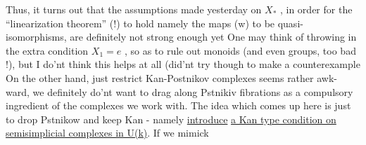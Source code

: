 Thus,  it turns out that the assumptions made yesterday on $X_{*}$ ,
in order for the ``linearization theorem'' (!) to hold\hand{,} namely the maps (w)
to be quasi-isomorphisms,  are definitely not strong enough yet One
may think of throwing in the extra condition  $X_{1}=e$ ,  so as to rule out
monoids (and even groups, too bad !),   but I do'nt think this
helps at all (did'nt try though to make a counterexample  On the
other hand,  just restrict Kan-Postnikov complexes seems rather awk-%
ward,   we definitely do'nt want to drag along Pstnikiv fibrations as
a compulsory ingredient of the complexes we work with.  The idea which
comes up here is just to drop Pstnikow and keep Kan -  namely \uline{introduce}
\uline{a Kan type condition on semisimplicial complexes in U(k)}.  If we mimick

